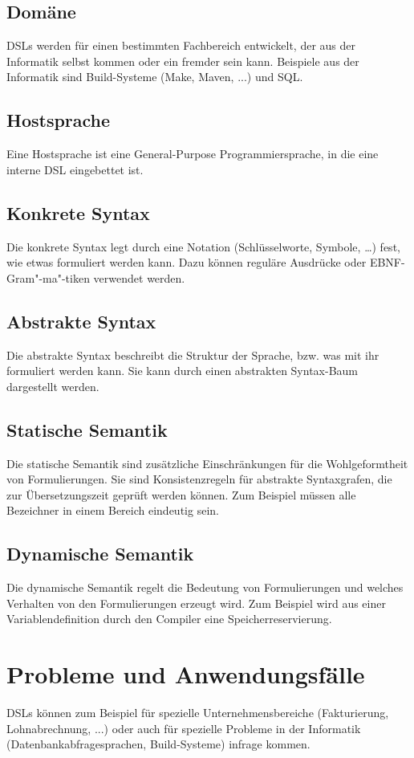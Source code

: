 \documentclass[../InterneDSLs.tex]{subfiles}
\begin{document}
\subsection{Domäne}
DSLs werden für einen bestimmten Fachbereich entwickelt, der aus der Informatik selbst kommen oder ein fremder sein kann. Beispiele aus der Informatik sind Build-Systeme (Make, Maven, ...) und SQL.

\subsection{Hostsprache}
Eine Hostsprache ist eine General-Purpose Programmiersprache, in die eine interne DSL eingebettet ist.

\subsection{Konkrete Syntax}
Die konkrete Syntax legt durch eine Notation (Schlüsselworte, Symbole, \ldots) fest, wie etwas formuliert werden kann. Dazu können reguläre Ausdrücke oder EBNF-Gram"-ma"-tiken verwendet werden.

\subsection{Abstrakte Syntax}
Die abstrakte Syntax beschreibt die Struktur der Sprache, bzw. was mit ihr formuliert werden kann. Sie kann durch einen abstrakten Syntax-Baum dargestellt werden.

\subsection{Statische Semantik}
Die statische Semantik sind zusätzliche Einschränkungen für die Wohlgeformtheit von Formulierungen. Sie sind Konsistenzregeln für abstrakte Syntaxgrafen, die zur Übersetzungszeit geprüft werden können. Zum Beispiel müssen alle Bezeichner in einem Bereich eindeutig sein.

\subsection{Dynamische Semantik}
Die dynamische Semantik regelt die Bedeutung von Formulierungen und welches Verhalten von den Formulierungen erzeugt wird. Zum Beispiel wird aus einer Variablendefinition durch den Compiler eine Speicherreservierung.


\section{Probleme und Anwendungsfälle}
DSLs können zum Beispiel für spezielle Unternehmensbereiche (Fakturierung, Lohnabrechnung, ...) oder auch für spezielle Probleme in der Informatik (Datenbankabfragesprachen, Build-Systeme) infrage kommen.
\end{document}

